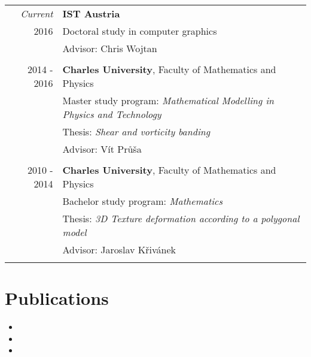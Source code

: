 \documentclass[a4paper,10pt]{article} %
\begin{document}
\begin{tabular}{rl}
  
  \emph{Current} & \textbf{IST Austria}\\
  2016           & Doctoral study in computer graphics \\
                 & Advisor: Chris Wojtan \\
                 &\\

  
  2014 - 2016 & \textbf{Charles University}, Faculty of Mathematics and Physics \\
                 & Master study program: \emph{Mathematical Modelling in Physics and Technology} \\
                 & Thesis: \emph{Shear and vorticity banding} \\
                 & Advisor: Vít Průša \\
                 &\\
  

  2010 - 2014 & \textbf{Charles University}, Faculty of Mathematics and Physics \\
                 & Bachelor study program: \emph{Mathematics} \\
                 & Thesis: \emph{3D Texture deformation according to a polygonal model} \\
                 & Advisor: Jaroslav Křivánek \\
                 &\\

\end{tabular}





\section{Publications}

\begin{itemize}
\item {}
\item {}
\item {}
\end{itemize}
\end{document}
